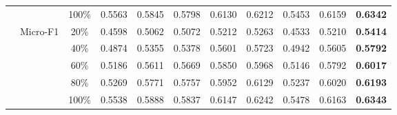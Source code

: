 \begin{table*}[t]
\begin{tabular}{|c|c|c|c|c|c|c|c|c|c|c|}
                        &                           & 100\%                       & 0.5563               & 0.5845               & 0.5798               & 0.6130                & 0.6212               & 0.5453                  & 0.6159               & \textbf{0.6342}       \\ \cline{2-11} 
                        & \multirow{5}{*}{Micro-F1} & 20\%                        & 0.4598               & 0.5062               & 0.5072               & 0.5212                & 0.5263               & 0.4533                  & 0.5210               & \textbf{0.5414}       \\  
                        &                           & 40\%                        & 0.4874               & 0.5355               & 0.5378               & 0.5601                & 0.5723               & 0.4942                  & 0.5605               & \textbf{0.5792}       \\  
                        &                           & 60\%                        & 0.5186               & 0.5611               & 0.5669               & 0.5850                & 0.5968               & 0.5146                  & 0.5792               & \textbf{0.6017}       \\  
                        &                           & 80\%                        & 0.5269               & 0.5771               & 0.5757               & 0.5952                & 0.6129               & 0.5237                  & 0.6020               & \textbf{0.6193}       \\  
                        &                           & 100\%                       & 0.5538               & 0.5888               & 0.5837               & 0.6147                & 0.6242               & 0.5478                  & 0.6163               & \textbf{0.6343}       \\ \hline
\end{tabular}
\end{table*}

